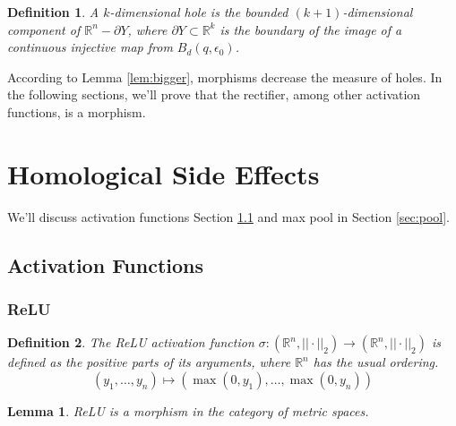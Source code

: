\documentclass{article}
\newtheorem{definition}{Definition}
\newtheorem{lemma}{Lemma}
\newcommand{\R}{\mathbb{R}}
\begin{document}
\begin{definition}
A \emph{$k$-dimensional hole} is the bounded $(k+1)$-dimensional component of $\R^n-\partial Y$, where $\partial Y\subset \R^{k}$ is the boundary of the image of a continuous injective map from $ B_d(q,\epsilon_0)$.
\end{definition}

According to Lemma \ref{lem:bigger}, morphisms decrease the measure of holes.
In the following sections, we'll prove that the rectifier, among other activation functions, is a morphism.

\section{Homological Side Effects}\label{sec:holes}
We'll discuss activation functions Section \ref{sec:act} and max pool in Section \ref{sec:pool}.

\subsection{Activation Functions}\label{sec:act}
\subsubsection{ReLU}
\begin{definition}
The \emph{ReLU activation function} $\sigma:(\R^n,||\cdot||_2)\to(\R^n,||\cdot||_2)$ is defined as the positive parts of its arguments, where $\R^n$ has the usual ordering.
\[
(y_1,\dots,y_n)\mapsto (\max(0, y_1), \dots, \max(0,y_n))
\]
\end{definition}

\begin{lemma}\label{lem:relu}
ReLU is a morphism in the category of metric spaces.
\end{lemma}
\end{document}
